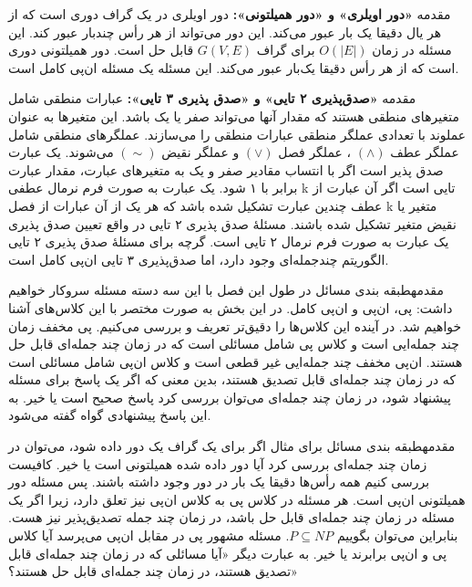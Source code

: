 \begin{itemframe}{مقدمه}
\itm
\textbf{«دور اویلری» و «دور همیلتونی»:}
دور اویلری
در یک گراف دوری است که از هر یال دقیقا یک بار عبور می‌کند. این دور می‌تواند از هر رأس چندبار عبور کند. این مسئله در زمان
$O(|E|)$
برای گراف
$G(V,E)$
قابل حل است. دور همیلتونی
 دوری است که از هر رأس دقیقا یک‌بار عبور می‌کند. این مسئله یک مسئله ان‌پی کامل است.
\end{itemframe}

\begin{itemframe}{مقدمه}
\itm
\textbf{«صدق‌پذیری ۲ تایی» و «صدق پذیری ۳ تایی»: }
عبارات منطقی شامل متغیرهای منطقی هستند که مقدار آنها می‌تواند صفر یا یک باشد. این متغیرها به عنوان عملوند با تعدادی عملگر منطقی عبارات منطقی را می‌سازند. عملگرهای منطقی شامل عملگر عطف
$(\wedge)$
، عملگر فصل
$(\vee)$
و عملگر نقیض
$(\sim)$
می‌شوند.
\sub
یک عبارت صدق پذیر
است اگر با انتساب مقادیر صفر و یک به متغیرهای عبارت، مقدار عبارت برابر با ۱ شود. یک عبارت به صورت فرم نرمال عطفی k تایی است اگر آن عبارت از عطف چندین عبارت تشکیل شده باشد که هر یک از آن عبارات از فصل k متغیر یا نقیض متغیر تشکیل شده باشند.
\sub
مسئلهٔ صدق پذیری ۲ تایی در واقع تعیین صدق پذیری یک عبارت به صورت فرم نرمال ۲ تایی است. گرچه برای مسئلهٔ صدق پذیری ۲ تایی الگوریتم چندجمله‌ای وجود دارد، اما صدق‌پذیری ۳ تایی ان‌پی کامل است.
\end{itemframe}

\begin{itemframe-s}{مقدمه}{طبقه بندی مسائل}
\itm
در طول این فصل با این سه دسته مسئله سروکار خواهیم داشت: پی، ان‌پی و ان‌پی کامل. در این بخش به صورت مختصر با این کلاس‌های آشنا خواهیم شد. در آینده این کلاس‌ها را دقیق‌تر تعریف و بررسی می‌کنیم.
\itm
پی مخفف زمان چند جمله‌ایی است
 و کلاس پی
شامل مسائلی است که در زمان چند جمله‌ای قابل حل هستند.
\itm
ان‌پی مخفف چند جمله‌ایی غیر قطعی
 است و کلاس ان‌پی
شامل مسائلی است که در زمان چند جمله‌ای قابل تصدیق
هستند، بدین معنی که اگر یک پاسخ برای مسئله پیشنهاد شود، در زمان چند جمله‌ای می‌توان بررسی کرد پاسخ صحیح است یا خیر. به این پاسخ پیشنهادی گواه
گفته می‌شود.
\end{itemframe-s}

\begin{itemframe-s}{مقدمه}{طبقه بندی مسائل}
\itm
برای مثال اگر برای یک گراف یک دور داده شود، می‌توان در زمان چند جمله‌ای بررسی کرد آیا دور داده شده همیلتونی است یا خیر. کافیست بررسی کنیم همه رأس‌ها دقیقا یک بار در دور وجود داشته باشند. پس مسئله دور همیلتونی ان‌پی است.
\itm
هر مسئله در کلاس پی به کلاس ان‌پی نیز تعلق دارد، زیرا اگر یک مسئله در زمان چند جمله‌ای قابل حل باشد، در زمان چند جمله تصدیق‌پذیر نیز هست. بنابراین می‌توان بگوییم
$P \subseteq NP$.
\itm
مسئله مشهور پی در مقابل ان‌پی
می‌پرسد آیا کلاس پی و ان‌پی برابرند یا خیر. به عبارت دیگر «آیا مسائلی که در زمان چند جمله‌ای قابل تصدیق هستند، در زمان چند جمله‌ای قابل حل هستند؟»
\end{itemframe-s}

